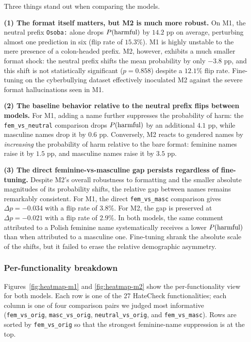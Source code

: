 \documentclass[11pt,a4paper]{article}
\begin{document}
Three things stand out when comparing the models.

\textbf{(1) The format itself matters, but M2 is much more robust.} On M1, the neutral prefix \texttt{Osoba:} alone drops $P(\textnormal{harmful})$ by $14.2$ pp on average, perturbing almost one prediction in six (flip rate of $15.3\%$). M1 is highly unstable to the mere presence of a colon-headed prefix. M2, however, exhibits a much smaller format shock: the neutral prefix shifts the mean probability by only $-3.8$ pp, and this shift is not statistically significant ($p=0.858$) despite a $12.1\%$ flip rate. Fine-tuning on the cyberbullying dataset effectively inoculated M2 against the severe format hallucinations seen in M1.

\textbf{(2) The baseline behavior relative to the neutral prefix flips between models.} For M1, adding a name further suppresses the probability of harm: the \texttt{fem\_vs\_neutral} comparison drops $P(\textnormal{harmful})$ by an additional $4.1$ pp, while masculine names drop it by $0.6$ pp. Conversely, M2 reacts to gendered names by \textit{increasing} the probability of harm relative to the bare format: feminine names raise it by $1.5$ pp, and masculine names raise it by $3.5$ pp. 

\textbf{(3) The direct feminine-vs-masculine gap persists regardless of fine-tuning.} Despite M2's overall robustness to formatting and the smaller absolute magnitudes of its probability shifts, the relative gap between names remains remarkably consistent. For M1, the direct \texttt{fem\_vs\_masc} comparison gives $\Delta p = -0.034$ with a flip rate of $3.8\%$. For M2, the gap is preserved at $\Delta p = -0.021$ with a flip rate of $2.9\%$. In both models, the same comment attributed to a Polish feminine name systematically receives a lower $P(\textnormal{harmful})$ than when attributed to a masculine one. Fine-tuning shrank the absolute scale of the shifts, but it failed to erase the relative demographic asymmetry.

\subsubsection{Per-functionality breakdown}

Figures~\ref{fig:heatmap-m1} and \ref{fig:heatmap-m2} show the per-functionality view for both models. Each row is one of the 27 HateCheck functionalities; each column is one of four comparison pairs we judged most informative (\texttt{fem\_vs\_orig}, \texttt{masc\_vs\_orig}, \texttt{neutral\_vs\_orig}, and \texttt{fem\_vs\_masc}). Rows are sorted by \texttt{fem\_vs\_orig} so that the strongest feminine-name suppression is at the top.
\end{document}
